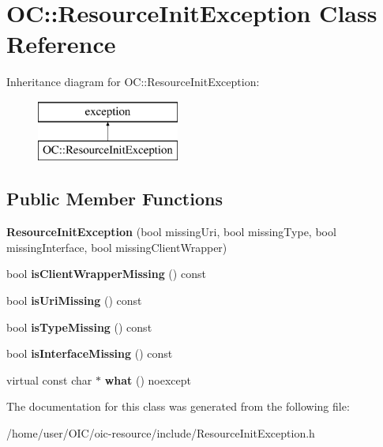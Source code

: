\hypertarget{classOC_1_1ResourceInitException}{}\section{O\+C\+:\+:Resource\+Init\+Exception Class Reference}
\label{classOC_1_1ResourceInitException}
Inheritance diagram for O\+C\+:\+:Resource\+Init\+Exception\+:\begin{figure}[H]
\begin{center}
\leavevmode
\includegraphics[height=2.000000cm]{classOC_1_1ResourceInitException}
\end{center}
\end{figure}
\subsection*{Public Member Functions}
\begin{DoxyCompactItemize}
\item 
\hypertarget{classOC_1_1ResourceInitException_ac5ad43fe888f0ab632052693ef93b568}{}{\bfseries Resource\+Init\+Exception} (bool missing\+Uri, bool missing\+Type, bool missing\+Interface, bool missing\+Client\+Wrapper)\label{classOC_1_1ResourceInitException_ac5ad43fe888f0ab632052693ef93b568}

\item 
\hypertarget{classOC_1_1ResourceInitException_a7f528ed516c39b24abf63ca1277671c8}{}bool {\bfseries is\+Client\+Wrapper\+Missing} () const \label{classOC_1_1ResourceInitException_a7f528ed516c39b24abf63ca1277671c8}

\item 
\hypertarget{classOC_1_1ResourceInitException_a4bb5568abea020a4f1d12b4bc598a5a5}{}bool {\bfseries is\+Uri\+Missing} () const \label{classOC_1_1ResourceInitException_a4bb5568abea020a4f1d12b4bc598a5a5}

\item 
\hypertarget{classOC_1_1ResourceInitException_a15184bf201431669766ab18d62c16749}{}bool {\bfseries is\+Type\+Missing} () const \label{classOC_1_1ResourceInitException_a15184bf201431669766ab18d62c16749}

\item 
\hypertarget{classOC_1_1ResourceInitException_a860a247b5cc91bcdee8a54764d6fc397}{}bool {\bfseries is\+Interface\+Missing} () const \label{classOC_1_1ResourceInitException_a860a247b5cc91bcdee8a54764d6fc397}

\item 
\hypertarget{classOC_1_1ResourceInitException_acad955d1cd40c2a01fdcd72af69743d5}{}virtual const char $\ast$ {\bfseries what} () noexcept\label{classOC_1_1ResourceInitException_acad955d1cd40c2a01fdcd72af69743d5}

\end{DoxyCompactItemize}


The documentation for this class was generated from the following file\+:\begin{DoxyCompactItemize}
\item 
/home/user/\+O\+I\+C/oic-\/resource/include/Resource\+Init\+Exception.\+h\end{DoxyCompactItemize}
